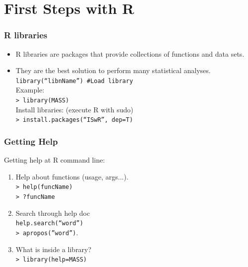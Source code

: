 \documentclass{beamer}
\begin{document}

\section{First Steps with R}


\begin{frame}

 \frametitle{R libraries}
 \begin{itemize}
  \item R libraries are packages that provide collections of functions
  and data sets.
  \item They are the best solution to perform many statistical
 analyses.\\
  \texttt{library(``libnName'') \#Load library}\\
  Example:\\
  \texttt{> library(MASS)}\\
  Install libraries: (execute R with sudo)\\
  \texttt{> install.packages(``ISwR'', dep=T)}
 \end{itemize}

\end{frame}


\begin{frame}

\frametitle{Getting Help}
  Getting help at R command line:
  \begin{enumerate}
   \item Help about functions (usage, args...).\\
   \texttt{> help(funcName)}\\
   \texttt{> ?funcName} 
   \item Search through help doc\\
   \texttt{help.search(``word'')}\\
   \texttt{> apropos(''word'')}.
   \item What is inside a library?\\
   \texttt{> library(help=MASS)}
   \end{enumerate}

\end{frame}

\end{document}
